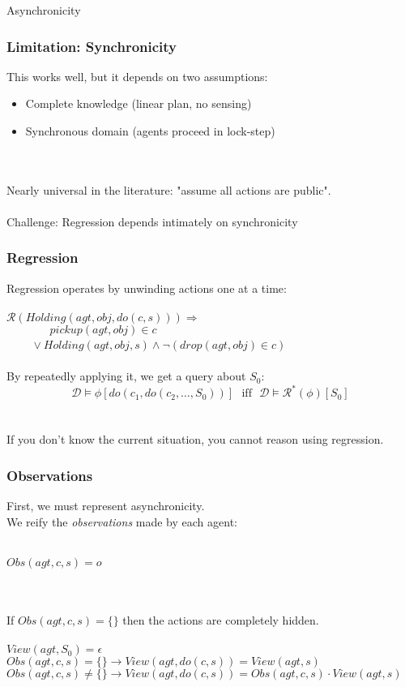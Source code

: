 \documentclass{beamer}
\newcommand{\Dt}{\mathcal{D}}
\newcommand{\Reg}{\mathcal{R}}
\begin{document}
\begin{frame}
\centering \large Asynchronicity\\
\end{frame}


\begin{frame}
\frametitle{Limitation: Synchronicity}
This works well, but it depends on two assumptions:
\begin{itemize}
\item Complete knowledge (linear plan, no sensing)
\item Synchronous domain (agents proceed in lock-step)
\end{itemize}
\pause
\ \\
\ \\
Nearly universal in the literature: "assume all actions are public".
\ \\
\ \\
\alert{Challenge:}  Regression depends intimately on synchronicity

\end{frame}

\begin{frame}
\frametitle{Regression}
Regression operates by unwinding actions one at a time:
\ \\
\ \\
$\Reg(Holding(agt,obj,do(c,s))) \Rightarrow$\\
$\,\,\,\,\,\,\,\,\,\,\,\,\,\,\,\,\,\,\,\,\,\,\,pickup(agt,obj) \in c$ \\
$\,\,\,\,\,\,\,\,\,\,\,\,\,\vee Holding(agt,obj,s) \wedge \neg\left(drop(agt,obj) \in c\right)$
\ \\
\ \\
\pause
By repeatedly applying it, we get a query about $S_0$:
\[
\Dt\models\phi[do(c_1,do(c_2,\dots,S_0))]\,\,\,\,\mathrm{iff}\,\,\,\,\Dt\models\Reg^{*}(\phi)[S_0]
\]
\ \\
\ \\
If you don't know the current situation, you cannot reason using regression.
\end{frame}

\begin{frame}
\frametitle{Observations}
First, we must represent asynchronicity.\\
We reify the \emph{observations} made by each agent:
\ \\
\ \\
\small
\begin{center}
$Obs(agt,c,s) = o$
\end{center}
\ \\
\ \\
If $Obs(agt,c,s)=\{\}$ then the actions are completely hidden.
\ \\
\ \\
\pause
$View(agt,S_0) = \epsilon$\\
$Obs(agt,c,s) = \{\} \rightarrow View(agt,do(c,s)) = View(agt,s)$\\
$Obs(agt,c,s) \neq \{\} \rightarrow View(agt,do(c,s)) = Obs(agt,c,s) \cdot View(agt,s)$
\normalsize
\end{frame}
\end{document}
